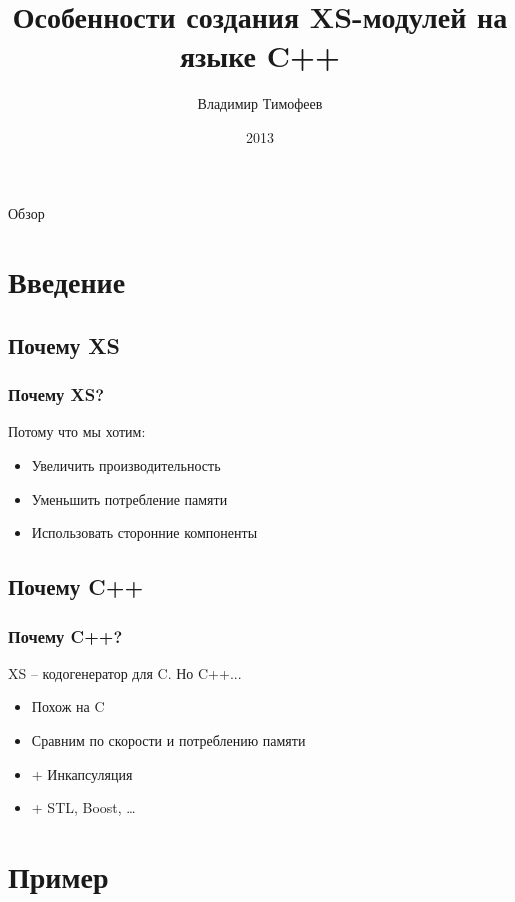 \documentclass[utf8x]{beamer}
\title{Особенности создания XS-модулей на языке C++}
\author{Владимир Тимофеев}
\date{2013}
\begin{document}
\begin{frame}
    \titlepage
\end{frame}

\begin{frame}{Обзор}
    \tableofcontents
\end{frame}

\section{Введение}

\subsection{Почему XS}

\begin{frame}
    \frametitle{Почему XS?}
    Потому что мы хотим:
    \begin{itemize}[<+->]
        \item Увеличить производительность
        \item Уменьшить потребление памяти
        \item Использовать сторонние компоненты
    \end{itemize}
\end{frame}

\subsection{Почему C++}

\begin{frame}
    \frametitle{Почему C++?}
    XS -- кодогенератор для C. Но C++...
    \begin{itemize}[<+->]
        \item Похож на C
        \item Сравним по скорости и потреблению памяти
        \item + Инкапсуляция
        \item + STL, Boost, \dots
    \end{itemize}
\end{frame}

\section{Пример}
\end{document}
